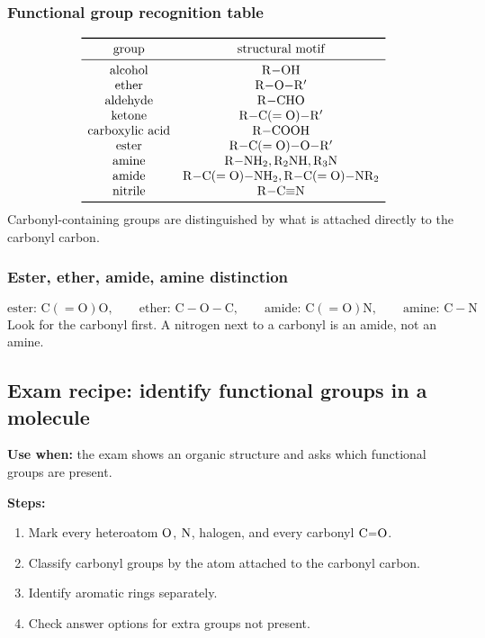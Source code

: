 \subsubsection{Functional group recognition table}
\[
\begin{array}{c c}
\toprule
\text{group} & \text{structural motif}\\
\midrule
\text{alcohol} & \mathrm{R{-}OH}\\
\text{ether} & \mathrm{R{-}O{-}R'}\\
\text{aldehyde} & \mathrm{R{-}CHO}\\
\text{ketone} & \mathrm{R{-}C(=O){-}R'}\\
\text{carboxylic acid} & \mathrm{R{-}COOH}\\
\text{ester} & \mathrm{R{-}C(=O){-}O{-}R'}\\
\text{amine} & \mathrm{R{-}NH_2},\mathrm{R_2NH},\mathrm{R_3N}\\
\text{amide} & \mathrm{R{-}C(=O){-}NH_2},\mathrm{R{-}C(=O){-}NR_2}\\
\text{nitrile} & \mathrm{R{-}C{\equiv}N}\\
\bottomrule
\end{array}
\]
Carbonyl-containing groups are distinguished by what is attached directly to the carbonyl carbon.

\subsubsection{Ester, ether, amide, amine distinction}
\[
\text{ester: }\mathrm{C(=O)O}, \qquad
\text{ether: }\mathrm{C{-}O{-}C}, \qquad
\text{amide: }\mathrm{C(=O)N}, \qquad
\text{amine: }\mathrm{C{-}N}
\]
Look for the carbonyl first. A nitrogen next to a carbonyl is an amide, not an amine.

\subsection{Exam recipe: identify functional groups in a molecule}
\textbf{Use when:} the exam shows an organic structure and asks which functional groups are present.

\textbf{Steps:}
\begin{enumerate}
    \item Mark every heteroatom \(\ce{O}\), \(\ce{N}\), halogen, and every carbonyl \(\ce{C=O}\).
    \item Classify carbonyl groups by the atom attached to the carbonyl carbon.
    \item Identify aromatic rings separately.
    \item Check answer options for extra groups not present.
\end{enumerate}


